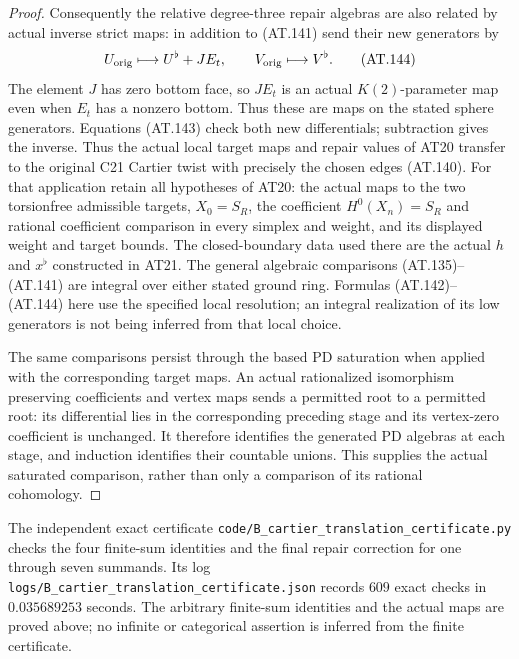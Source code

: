 \begin{proof}
Consequently the relative degree-three repair algebras
are also related by actual inverse strict maps: in
addition to (AT.141) send their new generators by
\[
                    U_{\rm orig}\longmapsto U^\flat+JE_t,
                      \qquad V_{\rm orig}\longmapsto V^\flat.
 \tag{AT.144}
\]
The element $J$ has zero bottom face, so $JE_t$ is an
actual $K(2)$-parameter map even when $E_t$ has a nonzero
bottom. Thus these are maps on the stated sphere generators.
Equations (AT.143) check both new differentials; subtraction
gives the inverse. Thus the actual local target maps and
repair values of AT20 transfer to the original C21 Cartier
twist with precisely the chosen edges (AT.140).
For that application retain all hypotheses of AT20:
the actual maps to the two torsionfree admissible targets,
$X_0=S_R$, the coefficient $H^0(X_n)=S_R$ and rational
coefficient comparison in every simplex and weight,
and its displayed weight and target bounds.
The closed-boundary data used there are the actual $h$
and $x^\flat$ constructed in AT21.
The general algebraic comparisons (AT.135)--(AT.141)
are integral over either stated ground ring. Formulas
(AT.142)--(AT.144) here use the specified local resolution;
an integral realization of its low generators is not
being inferred from that local choice.

The same comparisons persist through the based PD saturation
when applied with the corresponding target maps.
An actual rationalized isomorphism preserving coefficients
and vertex maps sends a permitted root to a permitted root:
its differential lies in the corresponding preceding stage
and its vertex-zero coefficient is unchanged.
It therefore identifies the generated PD algebras at each
stage, and induction identifies their countable unions.
This supplies the actual saturated comparison, rather than
only a comparison of its rational cohomology.
\end{proof}

The independent exact certificate
\texttt{code/B\_cartier\_translation\_certificate.py}
checks the four finite-sum identities and the final repair
correction for one through seven summands.
Its log \texttt{logs/B\_cartier\_translation\_certificate.json}
records $609$ exact checks in $0.035689253$ seconds.
The arbitrary finite-sum identities and the actual maps are
proved above; no infinite or categorical assertion is inferred
from the finite certificate.
